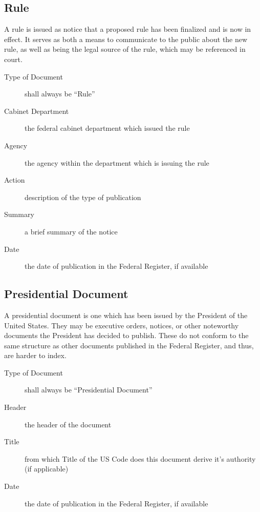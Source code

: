 \documentclass{sig-alternate-05-2015}
\begin{document}
\subsection{Rule}
A rule is issued as notice that a proposed rule has been finalized and is now in effect. It serves as both a means to communicate to the public about the new rule, as well as being the legal source of the rule, which may be referenced in court.
\begin{description}
\item[Type of Document] shall always be ``Rule''
\item[Cabinet Department] the federal cabinet department which issued the rule
\item[Agency] the agency within the department which is issuing the rule
\item[Action] description of the type of publication
\item[Summary] a brief summary of the notice
\item[Date] the date of publication in the Federal Register, if available
\end{description}

\subsection{Presidential Document}
A presidential document is one which has been issued by the President of the United States. They may be executive orders, notices, or other noteworthy documents the President has decided to publish. These do not conform to the same structure as other documents published in the Federal Register, and thus, are harder to index.
\begin{description}
\item[Type of Document] shall always be ``Presidential Document''
\item[Header] the header of the document
\item[Title] from which Title of the US Code does this document derive it's authority (if applicable)
\item[Date] the date of publication in the Federal Register, if available
\end{description}
\end{document}
